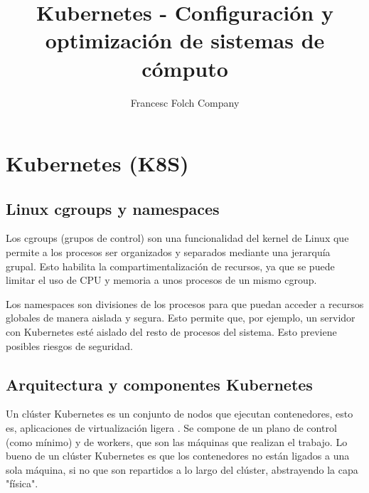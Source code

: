 \documentclass[]{article}
\title{Kubernetes - Configuración y optimización de sistemas de cómputo }
\author{Francesc Folch Company}
\begin{document}
\maketitle

\begin{abstract}

\end{abstract}

\section{Kubernetes (K8S)}

\subsection{Linux cgroups y namespaces}

Los cgroups (grupos de control)\cite{cgroups} son una funcionalidad del kernel de Linux que permite a los procesos ser organizados y separados mediante una jerarquía grupal. Esto habilita la compartimentalización de recursos, ya que se puede limitar el uso de CPU y memoria a unos procesos de un mismo cgroup.

Los namespaces \cite{namespaces} son divisiones de los procesos para que puedan acceder a recursos globales de manera aislada y segura. Esto permite que, por ejemplo, un servidor con Kubernetes esté aislado del resto de procesos del sistema. Esto previene posibles riesgos de seguridad.

\subsection{Arquitectura y componentes Kubernetes}

Un clúster Kubernetes es un conjunto de nodos que ejecutan contenedores, esto es, aplicaciones de virtualización ligera \cite{kubernetes}. Se compone de un plano de control (como mínimo) y de workers, que son las máquinas que realizan el trabajo. Lo bueno de un clúster Kubernetes es que los contenedores no están ligados a una sola máquina, si no que son repartidos a lo largo del clúster, abstrayendo la capa "física".
 
\end{document}
